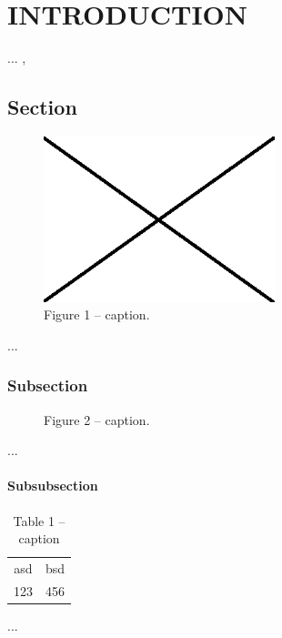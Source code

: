 \chapter{INTRODUCTION}
\label{sec:introduction}

... \cite{paper1}, \cite{paper2}

\section{Section}

\begin{figure}
	\centering\includegraphics[width=0.6\textwidth]{Figures/null}
	\caption{Figure 1 -- caption.}
	\label{fig1}
\end{figure}

...

\subsection{Subsection}

\begin{figure}
	\centering
	\caption{Figure 2 -- caption.}
	\label{fig2}
\end{figure}

...

\subsubsection{Subsubsection}

\begin{table}
	\centering
	\tabulinesep=0.8mm
	\caption{Table 1 -- caption}
		\begin{tabular}{c | c}
			asd & bsd \\
			123 & 456
		\end{tabular}
	\label{tab1}
\end{table}

...